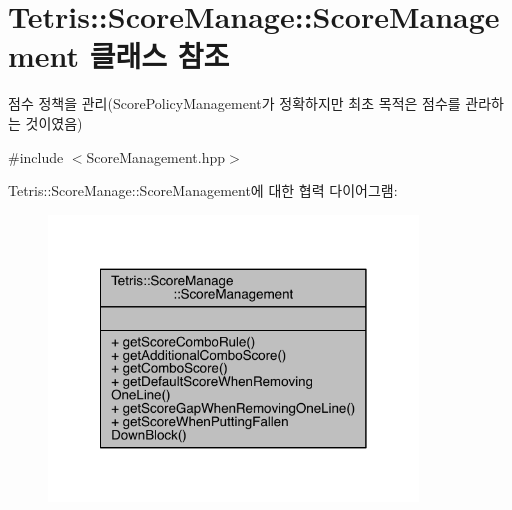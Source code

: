 \hypertarget{class_tetris_1_1_score_manage_1_1_score_management}{}\section{Tetris\+:\+:Score\+Manage\+:\+:Score\+Management 클래스 참조}
\label{class_tetris_1_1_score_manage_1_1_score_management}


점수 정책을 관리(Score\+Policy\+Management가 정확하지만 최초 목적은 점수를 관라하는 것이였음)  




{\ttfamily \#include $<$Score\+Management.\+hpp$>$}



Tetris\+:\+:Score\+Manage\+:\+:Score\+Management에 대한 협력 다이어그램\+:
\nopagebreak
\begin{figure}[H]
\begin{center}
\leavevmode
\includegraphics[width=278pt]{dc/d30/class_tetris_1_1_score_manage_1_1_score_management__coll__graph}
\end{center}
\end{figure}
